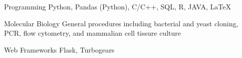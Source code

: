 

\begin{cvskills}

  \cvskill
  {Programming} %
  {Python, Pandas (Python), C/C++, SQL, R, JAVA, LaTeX} %


  \cvskill
  {Molecular Biology} %
  {General procedures including bacterial and yeast cloning, PCR, flow cytometry, and mammalian cell tissure culture} %

  \cvskill
  {Web Frameworks} %
  {Flask, Turbogears} %

\end{cvskills}
